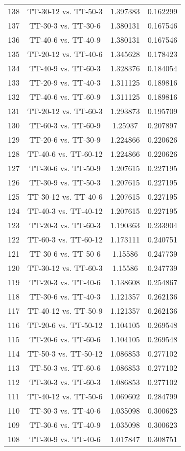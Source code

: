 \documentclass[a4paper,10pt]{article}
\begin{document}
\begin{landscape}
\begin{table}[!htp]
\begin{tabular}{cccc}
138&TT-30-12 vs. TT-50-3&1.397383&0.162299\\
137&TT-30-3 vs. TT-30-6&1.380131&0.167546\\
136&TT-40-6 vs. TT-40-9&1.380131&0.167546\\
135&TT-20-12 vs. TT-40-6&1.345628&0.178423\\
134&TT-40-9 vs. TT-60-3&1.328376&0.184054\\
133&TT-20-9 vs. TT-40-3&1.311125&0.189816\\
132&TT-40-6 vs. TT-60-9&1.311125&0.189816\\
131&TT-20-12 vs. TT-60-3&1.293873&0.195709\\
130&TT-60-3 vs. TT-60-9&1.25937&0.207897\\
129&TT-20-6 vs. TT-30-9&1.224866&0.220626\\
128&TT-40-6 vs. TT-60-12&1.224866&0.220626\\
127&TT-30-6 vs. TT-50-9&1.207615&0.227195\\
126&TT-30-9 vs. TT-50-3&1.207615&0.227195\\
125&TT-30-12 vs. TT-40-6&1.207615&0.227195\\
124&TT-40-3 vs. TT-40-12&1.207615&0.227195\\
123&TT-20-3 vs. TT-60-3&1.190363&0.233904\\
122&TT-60-3 vs. TT-60-12&1.173111&0.240751\\
121&TT-30-6 vs. TT-50-6&1.15586&0.247739\\
120&TT-30-12 vs. TT-60-3&1.15586&0.247739\\
119&TT-20-3 vs. TT-40-6&1.138608&0.254867\\
118&TT-30-6 vs. TT-40-3&1.121357&0.262136\\
117&TT-40-12 vs. TT-50-9&1.121357&0.262136\\
116&TT-20-6 vs. TT-50-12&1.104105&0.269548\\
115&TT-20-6 vs. TT-60-6&1.104105&0.269548\\
114&TT-50-3 vs. TT-50-12&1.086853&0.277102\\
113&TT-50-3 vs. TT-60-6&1.086853&0.277102\\
112&TT-30-3 vs. TT-60-3&1.086853&0.277102\\
111&TT-40-12 vs. TT-50-6&1.069602&0.284799\\
110&TT-30-3 vs. TT-40-6&1.035098&0.300623\\
109&TT-30-6 vs. TT-40-9&1.035098&0.300623\\
108&TT-30-9 vs. TT-40-6&1.017847&0.308751\\

\end{tabular}
\end{table}
\end{landscape}
\end{document}
